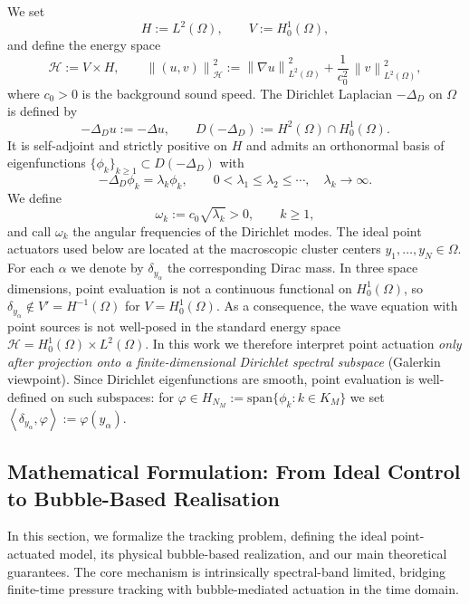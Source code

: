\documentclass[11pt,a4paper]{article}
\numberwithin{equation}{section}
\newtheorem{remark}[theorem]{Remark}
\newcommand{\norm}[1]{\left\lVert #1 \right\rVert}
\newcommand{\ip}[2]{\left\langle #1,#2 \right\rangle}
\newcommand{\locrev}[1]{{\color{localizationgreen}#1}}
\begin{document}
\noindent We set
\[
 H:=L^2(\Omega),\qquad V:=H^1_0(\Omega),
\]
and define the energy space
\[
 \mathcal{H}:=V\times H,\qquad
 \norm{(u,v)}_{\mathcal{H}}^2
 :=
 \norm{\nabla u}_{L^2(\Omega)}^2 + \frac{1}{c_0^2}\,\norm{v}_{L^2(\Omega)}^2,
\]
where $c_0>0$ is the background sound speed.
\newline
The Dirichlet Laplacian $-\Delta_D$ on $\Omega$ is defined by
\[
 -\Delta_D u := -\Delta u,\qquad
 D(-\Delta_D):=H^2(\Omega)\cap H^1_0(\Omega).
\]
It is self-adjoint and strictly positive on $H$ and admits an orthonormal basis of eigenfunctions $\{\phi_k\}_{k\ge1}\subset D(-\Delta_D)$ with
\[
 -\Delta_D\phi_k = \lambda_k\phi_k,\qquad
 0<\lambda_1\le\lambda_2\le\cdots,\quad \lambda_k\to\infty.
\]
We define
\[
 \omega_k:=c_0\sqrt{\lambda_k}>0,\qquad k\ge1,
\]
and call $\omega_k$ the angular frequencies of the Dirichlet modes.
\newline
The ideal point actuators used below are located at the macroscopic cluster centers $y_1,\dots,y_N\in\Omega$. For each $\alpha$ we denote by $\delta_{y_\alpha}$ the corresponding Dirac mass. In three space dimensions, point evaluation is not a continuous functional on $H^1_0(\Omega)$, so $\delta_{y_\alpha}\notin V'=H^{-1}(\Omega)$ for $V=H^1_0(\Omega)$. As a consequence, the wave equation with point sources is not well-posed in the standard energy space $\mathcal{H}=H^1_0(\Omega)\times L^2(\Omega)$.
\newline
In this work we therefore interpret point actuation \emph{only after projection onto a finite-dimensional Dirichlet spectral subspace} (Galerkin viewpoint). Since Dirichlet eigenfunctions are smooth, point evaluation is well-defined on such subspaces: for $\varphi\in H_{N_M}:=\mathrm{span}\{\phi_k:k\in K_M\}$ we set $\ip{\delta_{y_\alpha}}{\varphi}:=\varphi(y_\alpha).$



\subsection{Mathematical Formulation: From Ideal Control to Bubble-Based Realisation}
\label{subsec:math-formulation}
\noindent
In this section, we formalize the tracking problem, defining the ideal point-actuated model, its physical bubble-based realization, and our main theoretical guarantees. The core mechanism is intrinsically spectral-band limited, bridging finite-time pressure tracking with bubble-mediated actuation in the time domain.
\end{document}
